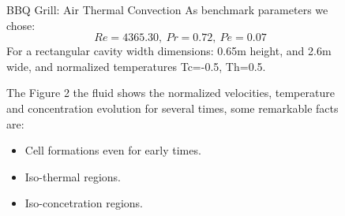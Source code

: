 \documentclass[final]{beamer}
\newlength{\sepwid}
\newlength{\onecolwid}
\newlength{\twocolwid}
\begin{document}
\begin{frame}[t]
\begin{columns}[t]
\begin{column}{\onecolwid}
\end{column} %

\begin{column}{\sepwid}\end{column} %

\begin{column}{\twocolwid} %

\begin{columns}[t,totalwidth=\twocolwid] %

\begin{column}{\onecolwid}\vspace{-.6in} %


\begin{block}{BBQ Grill: Air Thermal Convection}
	As benchmark parameters we chose:
	$$Re=4365.30, \: Pr=0.72, \: Pe=0.07$$
	For a rectangular cavity width dimensions: 0.65m height, and 2.6m wide, and normalized temperatures Tc=-0.5, Th=0.5. 

	\vspace{1em}
	The Figure 2 the fluid shows the normalized velocities, temperature and concentration evolution for several times, some remarkable facts are:
	\begin{itemize}
		\item Cell formations even for early times.
		\item Iso-thermal regions.
		\item Iso-concetration regions.
	\end{itemize}
\end{block}


\end{column} %

\begin{column}{\onecolwid}\vspace{-.6in} %



\end{column}
\end{columns}
\end{column}
\end{columns}
\end{frame}
\end{document}
